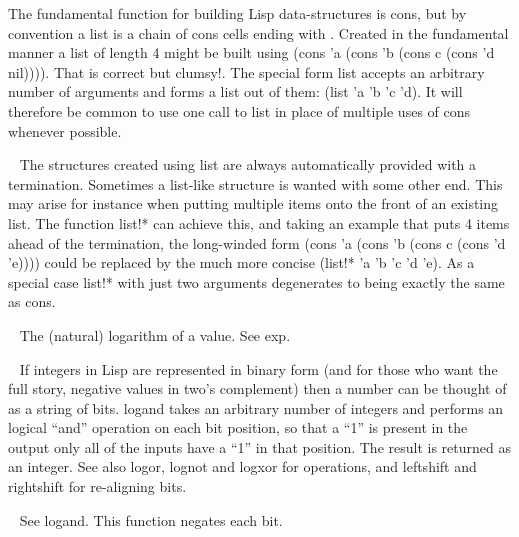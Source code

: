 \begin{description}
The fundamental function for building Lisp data-structures is {\tx cons},
but by convention a list is a chain of {\tx cons} cells ending with \nil.
Created in the fundamental manner a list of length 4 might be
built using {\tx (cons 'a (cons 'b (cons c (cons 'd nil))))}. That is correct
but clumsy!. The special form {\tx list} accepts an arbitrary number of
arguments and forms a list out of them: {\tx (list 'a 'b 'c 'd)}. It will
therefore be common to use one call to {\tx list} in place of
multiple uses of {\tx cons} whenever possible.
\item[{\tx list!*~~~~~~~} \hspace{1cm} {\em special form}]~\newline
The structures created using {\tx list} are always automatically provided
with a \nil{} termination. Sometimes a list-like structure is
wanted with some other end. This may arise for instance when putting
multiple items onto the front of an existing list. The function {\tx list!*}
can achieve this, and taking an example that puts 4 items ahead of the
termination, the long-winded form
{\tx (cons 'a (cons 'b (cons c (cons 'd 'e))))} could be replaced by the
much more concise {\tx (list!* 'a 'b 'c 'd 'e)}. As a special case
{\tx list!*} with just two arguments degenerates to being exactly the same
as {\tx cons}.
\item[{\tx log~~~~~~~~~~} \hspace{1cm} {\em special form}]~\newline
The (natural) logarithm of a value. See {\tx exp}.
\item[{\tx logand~~~~~~~} \hspace{1cm} {\em special form}]~\newline
If integers in Lisp are represented in binary form (and for those who want the
full story, negative values in two's complement) then a number can be thought
of as a string of bits. {\tx logand} takes an arbitrary number of integers
and performs an logical ``and'' operation on each bit position, so that a ``1''
is present in the output only all of the inputs have a ``1'' in that position.
The result is returned as an integer. See also {\tx logor}, {\tx lognot}
and {\tx logxor} for operations, and {\tx leftshift} and {\tx rightshift}
for re-aligning bits.
\item[{\tx lognot~~~~~~~} \hspace{1cm} {\em function 1 arg}]~\newline
See {\tx logand}. This function negates each bit.

\end{description}
